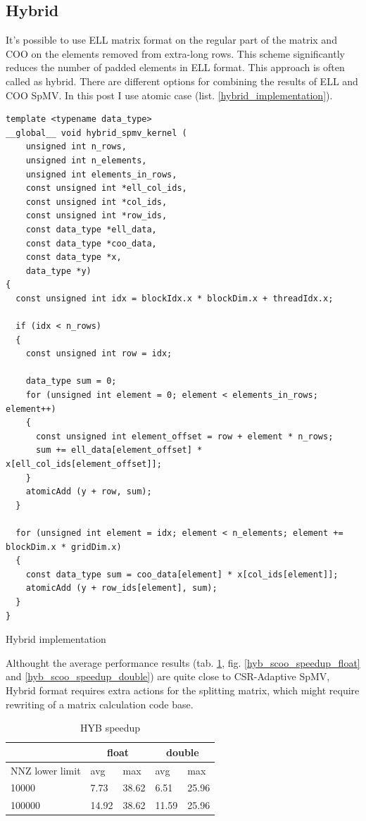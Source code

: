 \documentclass{article}
\begin{document}
\subsection{Hybrid}
It's possible to use ELL matrix format on the regular part of the matrix and COO on the elements removed from extra-long rows. This scheme
significantly reduces the number of padded elements in ELL format. This approach is often called as hybrid. There are different options
for combining the results of ELL and COO SpMV. In this post I use atomic case (list. \ref{hybrid_implementation}).

\begin{listing}[H]
\begin{verbatim}
template <typename data_type>
__global__ void hybrid_spmv_kernel (
    unsigned int n_rows,
    unsigned int n_elements,
    unsigned int elements_in_rows,
    const unsigned int *ell_col_ids,
    const unsigned int *col_ids,
    const unsigned int *row_ids,
    const data_type *ell_data,
    const data_type *coo_data,
    const data_type *x,
    data_type *y)
{
  const unsigned int idx = blockIdx.x * blockDim.x + threadIdx.x;

  if (idx < n_rows)
  {
    const unsigned int row = idx;

    data_type sum = 0;
    for (unsigned int element = 0; element < elements_in_rows; element++)
    {
      const unsigned int element_offset = row + element * n_rows;
      sum += ell_data[element_offset] * x[ell_col_ids[element_offset]];
    }
    atomicAdd (y + row, sum);
  }

  for (unsigned int element = idx; element < n_elements; element += blockDim.x * gridDim.x)
  {
    const data_type sum = coo_data[element] * x[col_ids[element]];
    atomicAdd (y + row_ids[element], sum);
  }
}
\end{verbatim}
\caption{Hybrid implementation}
\label{hybrid_implementation}
\end{listing}

Althought the average performance results (tab. \ref{hyb_speedup_table}, fig. \ref{hyb_scoo_speedup_float} and \ref{hyb_scoo_speedup_double}) are
quite close to CSR-Adaptive SpMV, Hybrid format requires extra actions for the splitting matrix, which might require rewriting of a matrix calculation code base.

\begin{table}[H]
	\centering
	\begin{tabular}{ |p{2.6cm}||p{1cm}|p{1cm}|p{1cm}|p{1cm}|  }
	 \hline
		& \multicolumn{2}{|c|}{float} & \multicolumn{2}{|c|}{double}\\
	 \hline
	 NNZ lower limit & avg & max & avg & max  \\
	 \hline
	 10000  & 7.73  & 38.62 & 6.51  & 25.96 \\
	 100000 & 14.92 & 38.62 & 11.59 & 25.96 \\
	 \hline
	\end{tabular}
	\caption{HYB speedup}
  \label{hyb_speedup_table}
\end{table}
\end{document}
